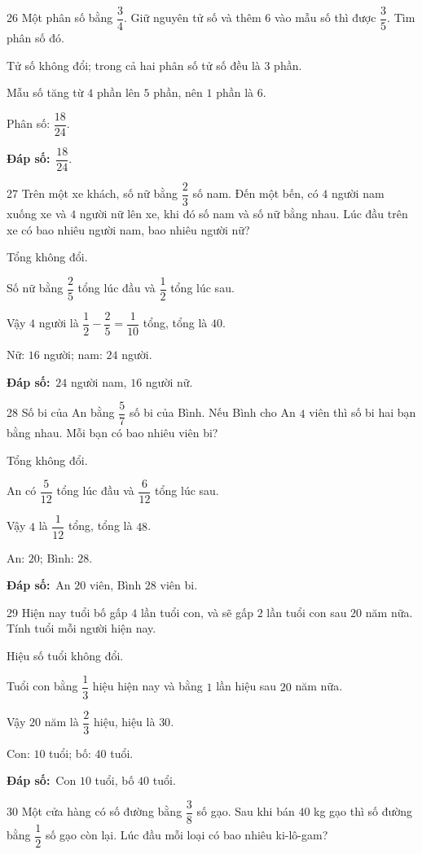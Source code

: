 \documentclass[11pt]{article}
\newif\ifsol \solfalse
\providecommand{\AnsWord}{Đáp số}
\newcommand{\dapso}[1]{\par\textbf{\AnsWord:}\ #1}
\newcommand{\probsol}[1]{%
  \begin{lrbox}{\solmeasure}\begin{minipage}{\dimexpr\linewidth-24pt\relax}#1\end{minipage}\end{lrbox}%
  \ifsol
    \begin{solbox}#1\end{solbox}%
  \else
    \setlength{\solht}{\dimexpr\ht\solmeasure+\dp\solmeasure+0.85cm\relax}%
    \ifdim\solht<1.35cm\setlength{\solht}{1.35cm}\fi
    \begin{tcolorbox}[colback=white,colframe=Line,boxrule=0.8pt,arc=5pt,
      left=8pt,right=8pt,top=4pt,bottom=4pt,height=\solht]{\footnotesize\color{Slate}\itshape\WorkWord}\end{tcolorbox}%
  \fi}
\newcommand{\gap}{\vspace{0.3cm}}
\def\WorkWord{Bài làm:}
\def\AnsWord{Đáp số}
\begin{document}
\gap
\begin{probbox}{26}{\relax}
Một phân số bằng $\dfrac34$. Giữ nguyên tử số và thêm $6$ vào mẫu số thì được $\dfrac35$. Tìm phân số đó.
\end{probbox}
\probsol{
Tử số không đổi; trong cả hai phân số tử số đều là $3$ phần.\par Mẫu số tăng từ $4$ phần lên $5$ phần, nên $1$ phần là $6$.\par Phân số: $\dfrac{18}{24}$.
\dapso{$\dfrac{18}{24}$.}}
\gap
\begin{probbox}{27}{\relax}
Trên một xe khách, số nữ bằng $\dfrac23$ số nam. Đến một bến, có $4$ người nam xuống xe và $4$ người nữ lên xe, khi đó số nam và số nữ bằng nhau. Lúc đầu trên xe có bao nhiêu người nam, bao nhiêu người nữ?
\end{probbox}
\probsol{
Tổng không đổi.\par Số nữ bằng $\dfrac25$ tổng lúc đầu và $\dfrac12$ tổng lúc sau.\par Vậy $4$ người là $\dfrac12-\dfrac25=\dfrac1{10}$ tổng, tổng là $40$.\par Nữ: $16$ người; nam: $24$ người.
\dapso{$24$ người nam, $16$ người nữ.}}
\gap
\begin{probbox}{28}{\relax}
Số bi của An bằng $\dfrac57$ số bi của Bình. Nếu Bình cho An $4$ viên thì số bi hai bạn bằng nhau. Mỗi bạn có bao nhiêu viên bi?
\end{probbox}
\probsol{
Tổng không đổi.\par An có $\dfrac5{12}$ tổng lúc đầu và $\dfrac6{12}$ tổng lúc sau.\par Vậy $4$ là $\dfrac1{12}$ tổng, tổng là $48$.\par An: $20$; Bình: $28$.
\dapso{An $20$ viên, Bình $28$ viên bi.}}
\gap
\begin{probbox}{29}{\relax}
Hiện nay tuổi bố gấp $4$ lần tuổi con, và sẽ gấp $2$ lần tuổi con sau $20$ năm nữa. Tính tuổi mỗi người hiện nay.
\end{probbox}
\probsol{
Hiệu số tuổi không đổi.\par Tuổi con bằng $\dfrac13$ hiệu hiện nay và bằng $1$ lần hiệu sau $20$ năm nữa.\par Vậy $20$ năm là $\dfrac23$ hiệu, hiệu là $30$.\par Con: $10$ tuổi; bố: $40$ tuổi.
\dapso{Con $10$ tuổi, bố $40$ tuổi.}}
\gap
\begin{probbox}{30}{\relax}
Một cửa hàng có số đường bằng $\dfrac38$ số gạo. Sau khi bán $40$ kg gạo thì số đường bằng $\dfrac12$ số gạo còn lại. Lúc đầu mỗi loại có bao nhiêu ki-lô-gam?
\end{probbox}
\end{document}

